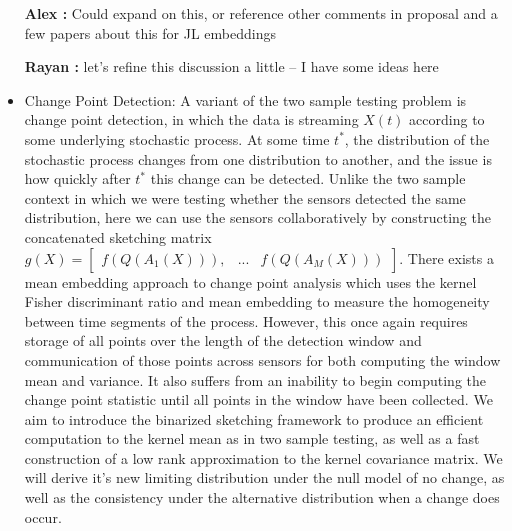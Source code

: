 \documentclass{article}
\newcommand{\comment}[3]{{\color{#1} {\bf #2 :} #3}}
\newcommand{\yoav}[1]{\comment{magenta}{Yoav}{#1}}
\newcommand{\rayan}[1]{\comment{red}{Rayan}{#1}}
\newcommand{\alex}[1]{\comment{green}{Alex}{#1}}
\begin{document}
\begin{itemize}
\alex{Could expand on this, or reference other comments in proposal and a few papers about this for JL embeddings}

\rayan{let's refine this discussion a little -- I have some ideas here}

\item Change Point Detection: A variant of the two sample testing problem is change point detection, in which the data is streaming $X(t)$ according to some underlying stochastic process.  At some time $t^*$, the distribution of the stochastic process changes from one distribution to another, and the issue is how quickly after $t^*$ this change can be detected.   Unlike the two sample context in which we were testing whether the sensors detected the same distribution, here we can use the sensors collaboratively by constructing the concatenated sketching matrix $g(X) = \begin{bmatrix}f(Q(A_1(X))), & ... & f(Q(A_M(X))) \end{bmatrix}$.
There exists a mean embedding approach to change point analysis \cite{Bach 2008} which uses the kernel Fisher discriminant ratio and mean embedding to measure the homogeneity between time segments of the process.  However, this once again requires storage of all points over the length of the detection window and communication of those points across sensors for both computing the window mean and variance. It also suffers from an inability to begin computing the change point statistic until all points in the window have been collected.  We aim to introduce the binarized sketching framework to produce an efficient computation to the kernel mean as in two sample testing, as well as a fast construction of a low rank approximation to the kernel covariance matrix.  We will derive it's new limiting distribution under the null model of no change, as well as the consistency under the alternative distribution when a change does occur.  


\end{itemize}
\end{document}
